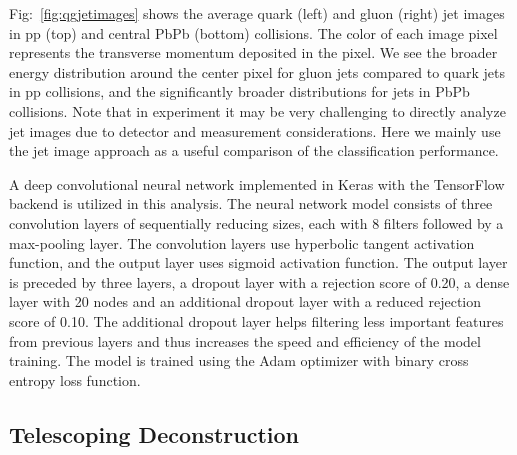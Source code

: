 \documentclass[notoc]{JHEP3}
\begin{document}
Fig:~\ref{fig:qgjetimages} shows the average quark (left) and gluon (right) jet images in pp (top) and central PbPb (bottom) collisions. The color of each image pixel represents the transverse momentum deposited in the pixel. We see the broader energy distribution around the center pixel for gluon jets compared to quark jets in pp collisions, and the significantly broader distributions for jets in PbPb collisions. Note that in experiment it may be very challenging to directly analyze jet images due to detector and measurement considerations. Here we mainly use the jet image approach as a useful comparison of the classification performance.
	
A deep convolutional neural network implemented in Keras with the TensorFlow backend is utilized in this analysis. The neural network model consists of three convolution layers of sequentially reducing sizes, each with 8 filters followed by a max-pooling layer. The convolution layers use hyperbolic tangent activation function, and the output layer uses sigmoid activation function. The output layer is preceded by three layers, a dropout layer with a rejection score of 0.20, a dense layer with 20 nodes and an additional dropout layer with a reduced rejection score of 0.10. The additional dropout layer helps filtering less important features from previous layers and thus increases the speed and efficiency of the model training. The model is trained using the Adam optimizer with binary cross entropy loss function.
	
\subsection{Telescoping Deconstruction}
\label{sec:tjet}
\end{document}
